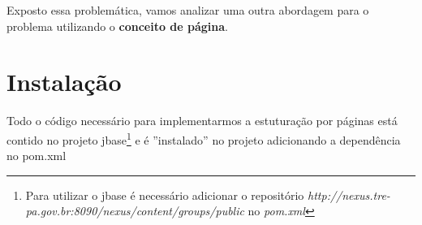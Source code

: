 \documentclass[a4paper,10pt]{article}
\begin{document}
Exposto essa problemática, vamos analizar uma outra abordagem para o
problema utilizando o \textbf{conceito de página}.
% 
%
\section{Instalação}
Todo o código necessário para implementarmos a estuturação por páginas está
contido no projeto jbase\footnote{Para utilizar o jbase é necessário adicionar
o repositório
\emph{http://nexus.tre-pa.gov.br:8090/nexus/content/groups/public} no
\emph{pom.xml}} e é ''instalado'' no projeto adicionando a dependência no
pom.xml
	
% 
%
\end{document}
